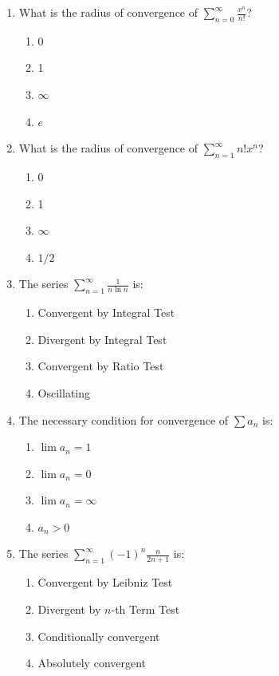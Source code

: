 \begin{enumerate}[leftmargin=1.5em]
    \item What is the radius of convergence of $\sum_{n=0}^\infty \frac{x^n}{n!}$?
    \begin{enumerate}[label=(\alph*)]
        \item 0
        \item 1
        \item $\infty$
        \item $e$
    \end{enumerate}

    \item What is the radius of convergence of $\sum_{n=1}^\infty n! x^n$?
    \begin{enumerate}[label=(\alph*)]
        \item 0
        \item 1
        \item $\infty$
        \item $1/2$
    \end{enumerate}

    \item The series $\sum_{n=1}^\infty \frac{1}{n \ln n}$ is:
    \begin{enumerate}[label=(\alph*)]
        \item Convergent by Integral Test
        \item Divergent by Integral Test
        \item Convergent by Ratio Test
        \item Oscillating
    \end{enumerate}

    \item The necessary condition for convergence of $\sum a_n$ is:
    \begin{enumerate}[label=(\alph*)]
        \item $\lim a_n = 1$
        \item $\lim a_n = 0$
        \item $\lim a_n = \infty$
        \item $a_n > 0$
    \end{enumerate}

    \item The series $\sum_{n=1}^\infty (-1)^n \frac{n}{2n+1}$ is:
    \begin{enumerate}[label=(\alph*)]
        \item Convergent by Leibniz Test
        \item Divergent by $n$-th Term Test
        \item Conditionally convergent
        \item Absolutely convergent
    \end{enumerate}


\end{enumerate}
